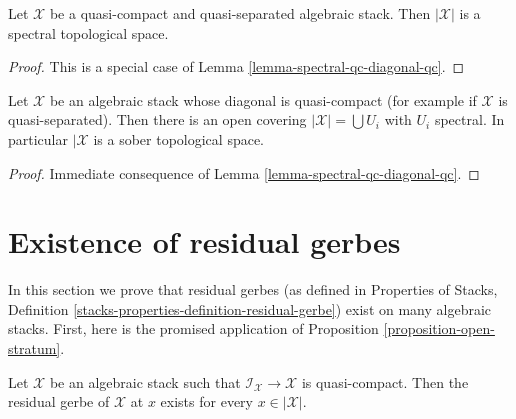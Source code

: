 \begin{lemma}
\label{lemma-spectral-qcqs}
Let $\mathcal{X}$ be a quasi-compact and quasi-separated algebraic stack.
Then $|\mathcal{X}|$ is a spectral topological space.
\end{lemma}

\begin{proof}
This is a special case of Lemma \ref{lemma-spectral-qc-diagonal-qc}.
\end{proof}

\begin{lemma}
\label{lemma-sober-qs}
Let $\mathcal{X}$ be an algebraic stack whose diagonal is quasi-compact
(for example if $\mathcal{X}$ is quasi-separated).
Then there is an open covering $|\mathcal{X}| = \bigcup U_i$
with $U_i$ spectral. In particular $|\mathcal{X}$ is
a sober topological space.
\end{lemma}

\begin{proof}
Immediate consequence of Lemma \ref{lemma-spectral-qc-diagonal-qc}.
\end{proof}






\section{Existence of residual gerbes}
\label{section-existence-residual-gerbes}

\noindent
In this section we prove that residual gerbes (as defined in
Properties of Stacks, Definition
\ref{stacks-properties-definition-residual-gerbe})
exist on many algebraic stacks. First, here is the promised
application of
Proposition \ref{proposition-open-stratum}.

\begin{lemma}
\label{lemma-every-point-residual-gerbe}
Let $\mathcal{X}$ be an algebraic stack such that
$\mathcal{I}_\mathcal{X} \to \mathcal{X}$ is quasi-compact.
Then the residual gerbe of $\mathcal{X}$ at $x$ exists for
every $x \in |\mathcal{X}|$.
\end{lemma}


